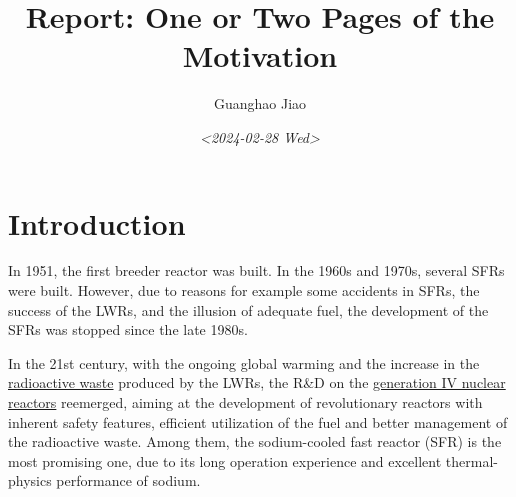 \documentclass[11pt]{article}
\author{Guanghao Jiao}
\date{\textit{<2024-02-28 Wed>}}
\title{Report: One or Two Pages of the Motivation}
\begin{document}
\maketitle

\section{Introduction}
\label{sec:orgf1a7d44}
In 1951, the first breeder reactor was built. In the 1960s and 1970s, several SFRs were built. However, due to reasons for example some accidents in SFRs, the success of the LWRs, and the illusion of adequate fuel, the development of the SFRs was stopped since the late 1980s.

In the 21st century, with the ongoing global warming and the increase in the \href{20240203204039-radioactive_waste.org}{radioactive waste} produced by the LWRs, the R\&D on the \href{20240131150544-nuclear_reactor_generation_iv.org}{generation IV nuclear reactors} reemerged, aiming at the development of revolutionary reactors with inherent safety features, efficient utilization of the fuel and better management of the radioactive waste. Among them, the sodium-cooled fast reactor (SFR) is the most promising one, due to its long operation experience and excellent thermal-physics performance of sodium.

\cite{TechnologyRoadmapUpdate}

\href{20240302021525-two_dimensional_numerical_simulation_of_single_bubble_rising_behavior_in_liquid_metal_using_moving_particle_semi_implicit_method.org}{\cite{zuoTwodimensionalNumericalSimulation2013}}



\end{document}
